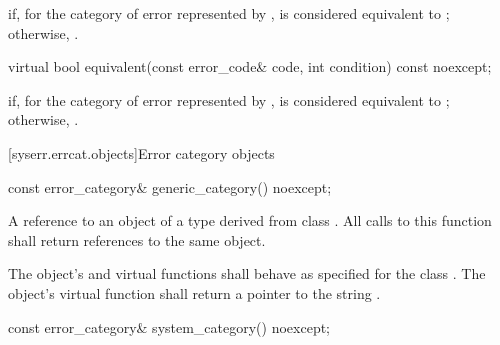 \begin{itemdescr}
\pnum
\returns {} if, for the category of error represented by ,  is considered equivalent to ; otherwise, .
\end{itemdescr}

%
\begin{itemdecl}
virtual bool equivalent(const error_code& code, int condition) const noexcept;
\end{itemdecl}

\begin{itemdescr}
\pnum
\returns {} if, for the category of error represented by ,  is considered equivalent to ; otherwise, .
\end{itemdescr}

[syserr.errcat.objects]{Error category objects}

%
\begin{itemdecl}
const error_category& generic_category() noexcept;
\end{itemdecl}

\begin{itemdescr}
\pnum
\returns A reference to an object of a type derived from class .
All calls to this function shall return references to the same object.

\pnum
\remarks The object's  and  virtual functions shall behave as specified for the class . The object's  virtual function shall return a pointer to the string .
\end{itemdescr}

%
\begin{itemdecl}
const error_category& system_category() noexcept;
\end{itemdecl}

